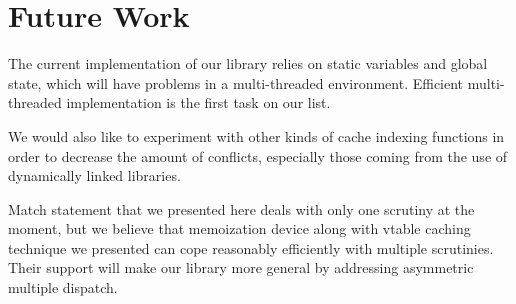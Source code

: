 \section{Future Work} %
\label{sec:fw}

The current implementation of our library relies on static variables and global 
state, which will have problems in a multi-threaded environment. Efficient 
multi-threaded implementation is the first task on our list. 

We would also like to experiment with other kinds of cache indexing functions in 
order to decrease the amount of conflicts, especially those coming from the use 
of dynamically linked libraries.

Match statement that we presented here deals with only one scrutiny at the 
moment, but we believe that memoization device along with vtable caching 
technique we presented can cope reasonably efficiently with multiple scrutinies. 
Their support will make our library more general by addressing asymmetric 
multiple dispatch.
